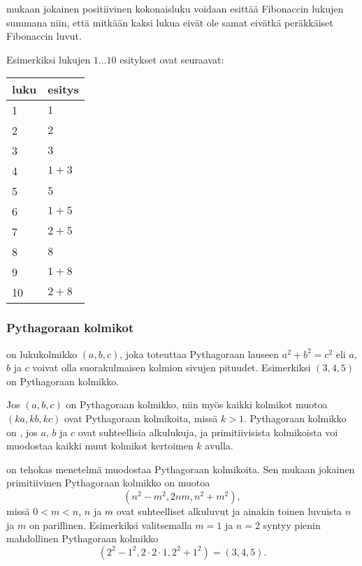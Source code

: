 
 mukaan jokainen positiivinen kokonaisluku voidaan
esittää Fibonaccin lukujen summana niin, että
mitkään kaksi lukua eivät ole samat eivätkä peräkkäiset
Fibonaccin luvut.

Esimerkiksi lukujen $1 \ldots 10$ esitykset ovat seuraavat:

\begin{center}
\begin{tabular}{ll}
luku & esitys \\
\hline
1 & $1$ \\
2 & $2$ \\
3 & $3$ \\
4 & $1+3$ \\
5 & $5$ \\
6 & $1+5$ \\
7 & $2+5$ \\
8 & $8$ \\
9 & $1+8$ \\
10 & $2+8$ \\
\end{tabular}
\end{center}

\subsubsection{Pythagoraan kolmikot}


 on lukukolmikko $(a,b,c)$,
joka toteuttaa Pythagoraan lauseen $a^2+b^2=c^2$
eli $a$, $b$ ja $c$ voivat olla suorakulmaisen
kolmion sivujen pituudet.
Esimerkiksi $(3,4,5)$ on Pythagoraan kolmikko.

Jos $(a,b,c)$ on Pythagoraan kolmikko,
niin myös kaikki kolmikot muotoa $(ka,kb,kc)$
ovat Pythagoraan kolmikoita,
missä $k>1$.
Pythagoraan kolmikko on ,
jos $a$, $b$ ja $c$ ovat suhteellisia alkulukuja,
ja primitiivisista kolmikoista voi muodostaa
kaikki muut kolmikot kertoimen $k$ avulla.

 on tehokas menetelmä muodostaa
Pythagoraan kolmikoita.
Sen mukaan jokainen primitiivinen
Pythagoraan kolmikko on muotoa
\[(n^2-m^2,2nm,n^2+m^2),\]
missä $0<m<n$, $n$ ja $m$ ovat suhteelliset
alkuluvut ja ainakin toinen luvuista $n$ ja $m$ on parillinen.
Esimerkiksi valitsemalla $m=1$ ja $n=2$ syntyy
pienin mahdollinen Pythagoraan kolmikko
\[(2^2-1^2,2\cdot2\cdot1,2^2+1^2)=(3,4,5).\]

